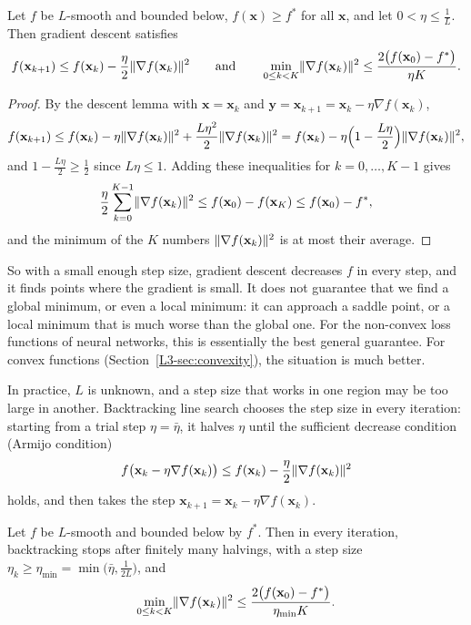 \begin{theorem}\label{L3-thm:gd-smooth}
    Let $f$ be $L$-smooth and bounded below, $f(\mathbf{x}) \geq f^*$ for all $\mathbf{x}$, and let $0 < \eta \leq \frac{1}{L}$. Then gradient descent satisfies
    \[f(\mathbf{x}_{k+1}) \leq f(\mathbf{x}_k) - \frac{\eta}{2}\lVert \nabla f(\mathbf{x}_k) \rVert^2 \qquad \text{and} \qquad \min_{0 \leq k < K} \lVert \nabla f(\mathbf{x}_k) \rVert^2 \leq \frac{2\big(f(\mathbf{x}_0) - f^*\big)}{\eta K}.\]
\end{theorem}

\begin{proof}
    By the descent lemma with $\mathbf{x} = \mathbf{x}_k$ and $\mathbf{y} = \mathbf{x}_{k+1} = \mathbf{x}_k - \eta\nabla f(\mathbf{x}_k)$,
    \[f(\mathbf{x}_{k+1}) \leq f(\mathbf{x}_k) - \eta\lVert \nabla f(\mathbf{x}_k) \rVert^2 + \frac{L\eta^2}{2}\lVert \nabla f(\mathbf{x}_k) \rVert^2 = f(\mathbf{x}_k) - \eta\Big(1 - \frac{L\eta}{2}\Big)\lVert \nabla f(\mathbf{x}_k) \rVert^2,\]
    and $1 - \frac{L\eta}{2} \geq \frac{1}{2}$ since $L\eta \leq 1$. Adding these inequalities for $k = 0, \ldots, K - 1$ gives
    \[\frac{\eta}{2}\sum_{k=0}^{K-1} \lVert \nabla f(\mathbf{x}_k) \rVert^2 \leq f(\mathbf{x}_0) - f(\mathbf{x}_K) \leq f(\mathbf{x}_0) - f^*,\]
    and the minimum of the $K$ numbers $\lVert \nabla f(\mathbf{x}_k) \rVert^2$ is at most their average.
\end{proof}

So with a small enough step size, gradient descent decreases $f$ in every step, and it finds points where the gradient is small. It does not guarantee that we find a global minimum, or even a local minimum: it can approach a saddle point, or a local minimum that is much worse than the global one. For the non-convex loss functions of neural networks, this is essentially the best general guarantee. For convex functions (Section~\ref{L3-sec:convexity}), the situation is much better.

In practice, $L$ is unknown, and a step size that works in one region may be too large in another. Backtracking line search chooses the step size in every iteration: starting from a trial step $\eta = \bar\eta$, it halves $\eta$ until the sufficient decrease condition (Armijo condition)
\[f\big(\mathbf{x}_k - \eta\nabla f(\mathbf{x}_k)\big) \leq f(\mathbf{x}_k) - \frac{\eta}{2}\lVert \nabla f(\mathbf{x}_k) \rVert^2\]
holds, and then takes the step $\mathbf{x}_{k+1} = \mathbf{x}_k - \eta\nabla f(\mathbf{x}_k)$.

\begin{proposition}\label{L3-prop:backtracking}
    Let $f$ be $L$-smooth and bounded below by $f^*$. Then in every iteration, backtracking stops after finitely many halvings, with a step size $\eta_k \geq \eta_{\min} = \min\big(\bar\eta, \frac{1}{2L}\big)$, and
    \[\min_{0 \leq k < K} \lVert \nabla f(\mathbf{x}_k) \rVert^2 \leq \frac{2\big(f(\mathbf{x}_0) - f^*\big)}{\eta_{\min}K}.\]
\end{proposition}

